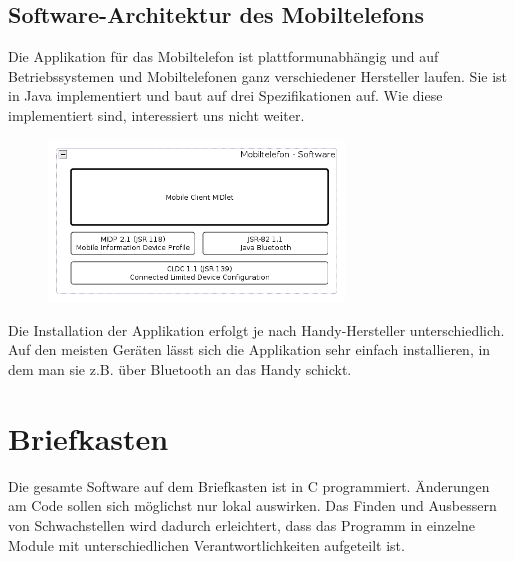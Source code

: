 \documentclass[ngerman]{article}
\begin{document}
        \subsection{Software-Architektur des Mobiltelefons}

Die Applikation für das Mobiltelefon ist plattformunabhängig und auf Betriebssystemen und
Mobiltelefonen ganz verschiedener Hersteller laufen. Sie ist in Java implementiert und baut
auf drei Spezifikationen auf. Wie diese implementiert sind, interessiert uns nicht weiter.

\begin{figure}[h!] \begin{center}
    \includegraphics[width=0.7\textwidth]{media/mobile-client-arch}
\end{center} \end{figure}

Die Installation der Applikation erfolgt je nach Handy-Hersteller unterschiedlich. Auf den
meisten Geräten lässt sich die Applikation sehr einfach installieren, in dem man sie z.B.
über Bluetooth an das Handy schickt. 


\section{Briefkasten}

Die gesamte Software auf dem Briefkasten ist in C programmiert. Änderungen
am Code sollen sich möglichst nur lokal auswirken. Das Finden und Ausbessern von 
Schwachstellen wird dadurch erleichtert, dass das Programm in einzelne Module
mit unterschiedlichen Verantwortlichkeiten aufgeteilt ist.
\end{document}

